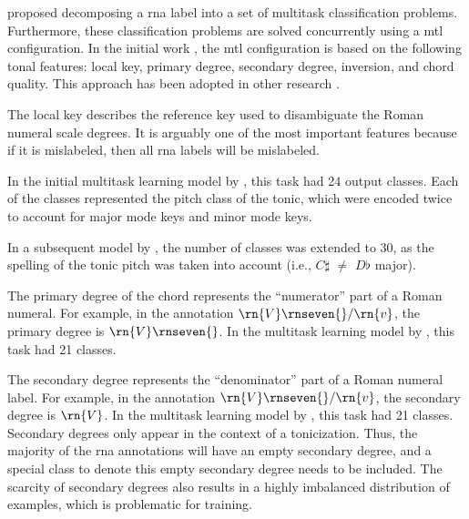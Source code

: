 
\textcite{chen2018functional} proposed decomposing a
\gls{rna} label into a set of multitask classification
problems. Furthermore, these classification problems are
solved concurrently using a \gls{mtl} configuration. In the
initial work \textcite{chen2018functional}, the \gls{mtl}
configuration is based on the following tonal features:
local key, primary degree, secondary degree, inversion, and
chord quality. This approach has been adopted in other
research \parencite{chen2019harmony,
micchi2020not,micchi2021deep}.


The local key describes the reference key used to
disambiguate the Roman numeral scale degrees. It is arguably
one of the most important features because if it is
mislabeled, then all \gls{rna} labels will be mislabeled.

In the initial multitask learning model by
\textcite{chen2018functional}, this task had 24 output
classes. Each of the classes represented the pitch class of
the tonic, which were encoded twice to account for major
mode keys and minor mode keys.

In a subsequent model by \textcite{micchi2020not}, the
number of classes was extended to 30, as the spelling of the
tonic pitch was taken into account (i.e., $C\sharp$ $\neq$
$D\flat$ major).



The primary degree of the chord represents the ``numerator''
part of a Roman numeral. For example, in the annotation
$\rn{V}\rnseven{}/\rn{v}$, the primary degree is
$\rn{V}\rnseven{}$. In the multitask learning model by
\textcite{chen2018functional}, this task had 21 classes.


The secondary degree represents the ``denominator'' part of
a Roman numeral label. For example, in the annotation
$\rn{V}\rnseven{}/\rn{v}$, the secondary degree is $\rn{V}$.
In the multitask learning model by
\textcite{chen2018functional}, this task had 21 classes.
Secondary degrees only appear in the context of a
tonicization. Thus, the majority of the \gls{rna}
annotations will have an empty secondary degree, and a
special class to denote this empty secondary degree needs to
be included. The scarcity of secondary degrees also results
in a highly imbalanced distribution of examples, which is
problematic for training.

